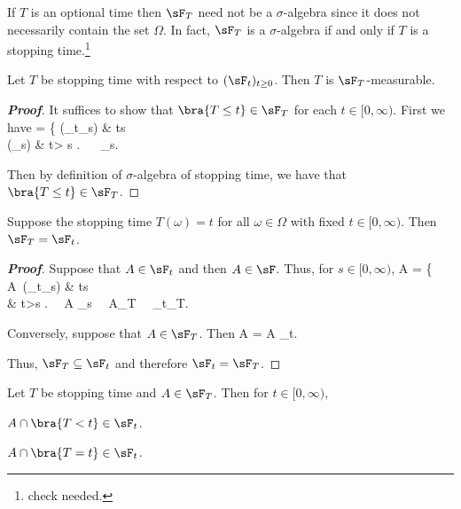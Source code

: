 \begin{remark}
If $T$ is an optional time then $\sF_T$ need not be a $\sigma$-algebra since it does not necessarily contain the set $\Omega$. In fact, $\sF_T$ is a $\sigma$-algebra if and only if $T$ is a stopping time.\footnote{check needed.}
\end{remark}


\begin{proposition}\label{pro:stopping_time_is_sigma_algebra_of_stopping_time_measurable}
Let $T$ be stopping time with respect to $(\sF_t)_{t\geq 0}$. Then $T$ is $\sF_T$-measurable.
\end{proposition}

\begin{proof}[\bf Proof]
It suffices to show that $\bra{T\leq t}\in \sF_T$ for each $t\in [0,\infty)$. First we have
\be
{}\cap {} = \left\{
 (\in \sF_t\subseteq \sF_s) \quad\quad & t\leq s \\
(\in \sF_s) & t> s
\ea
\right. \ \ra\ \cap {} \in \sF_s.
\ee 

Then by definition of $\sigma$-algebra of stopping time, we have that $\bra{T\leq t}\in \sF_T$.
\end{proof}

\begin{proposition}
Suppose the stopping time $T(\omega)=t$ for all $\omega \in \Omega$ with fixed $t\in [0,\infty)$. Then $\sF_T = \sF_t$. 
\end{proposition}

\begin{proof}[\bf Proof]
Suppose that $A\in \sF_t$ and then $A\in \sF$. Thus, for $s\in [0,\infty)$, 
\be
A\cap {} = \left\{
A\ (\in \sF_t\subseteq \sF_s) \quad\quad & t\leq s \\
\emptyset & t>s 
\ea\right. \ \ra\ A\cap {} \in \sF_s \ \ra\ A\in \sF_T \ \ra\ \sF_t\subseteq \sF_T.
\ee

Conversely, suppose that $A\in \sF_T$. Then
\be
A = A \cap {} \in \sF_t.
\ee

Thus, $\sF_T\subseteq \sF_t$ and therefore $\sF_t= \sF_T$.
\end{proof}


\begin{lemma}\label{lem:sigma_algebra_stopping_time_continuous_strictly_smaller_equal}
Let $T$ be stopping time and $A\in \sF_T$. Then for $t\in [0,\infty)$,
\ben
\item [(i)] $A\cap \bra{T<t} \in \sF_t$.
\item [(ii)] $A\cap \bra{T=t}\in \sF_t$.
\een
\end{lemma}

